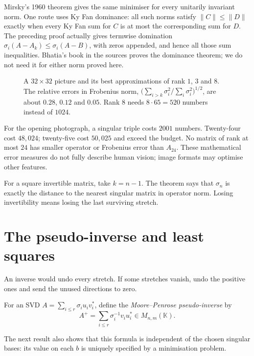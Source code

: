 \begin{remark}
Mirsky's 1960 theorem gives the same minimiser for every unitarily invariant norm. One route uses Ky Fan dominance: all such norms satisfy $\|C\|\le\|D\|$ exactly when every Ky Fan sum for $C$ is at most the corresponding sum for $D$. The preceding proof actually gives termwise domination $\sigma_i(A-A_k)\le\sigma_i(A-B)$, with zeros appended, and hence all those sum inequalities. Bhatia's book in the sources proves the dominance theorem; we do not need it for either norm proved here.
\end{remark}

\begin{figure}[ht]
\centering
{}
\caption{A $32\times32$ picture and its best approximations of rank $1$, $3$ and $8$. The relative errors in Frobenius norm,
$\bigl(\sum_{i>k}\sigma_i^2/\sum_i\sigma_i^2\bigr)^{1/2}$, are about $0.28$, $0.12$ and $0.05$. Rank $8$ needs $8\cdot65=520$
numbers instead of $1024$.}
\label{linear:fig:lowrank}
\end{figure}

For the opening photograph, a singular triple costs $2001$ numbers. Twenty-four cost $48{,}024$; twenty-five cost $50{,}025$ and exceed the budget. No matrix of rank at most $24$ has smaller operator or Frobenius error than $A_{24}$. These mathematical error measures do not fully describe human vision; image formats may optimise other features.

For a square invertible matrix, take $k=n-1$. The theorem says that $\sigma_n$ is exactly the distance to the nearest singular matrix in operator norm. Losing invertibility means losing the last surviving stretch.

\section{The pseudo-inverse and least squares}

An inverse would undo every stretch. If some stretches vanish, undo the positive ones and send the unused directions to zero.

\begin{definition}\label{linear:def:pinv}
For an SVD $A=\sum_{i\le r}\sigma_iu_iv_i^*$, define the \emph{Moore--Penrose pseudo-inverse} by
\[
A^+=\sum_{i\le r}\sigma_i^{-1}v_iu_i^*\in M_{n,m}(\mathbb K).
\]
\end{definition}

The next result also shows that this formula is independent of the chosen singular bases: its value on each $b$ is uniquely specified by a minimisation problem.

